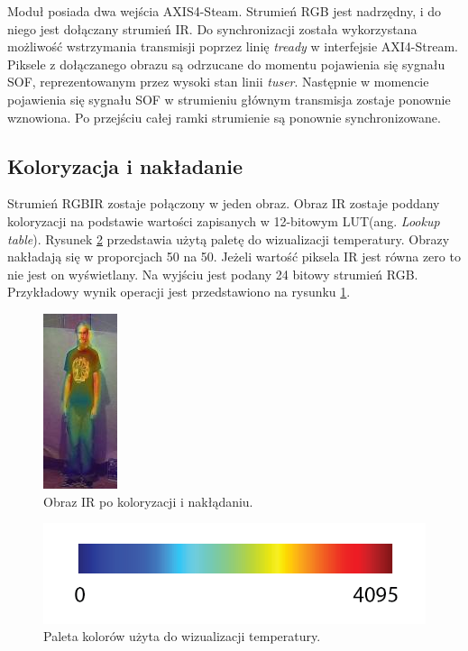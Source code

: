 Moduł posiada dwa wejścia AXIS4-Steam. Strumień RGB jest nadrzędny, i do niego jest dołączany  strumień IR. %
Do synchronizacji została wykorzystana możliwość wstrzymania transmisji poprzez linię \textit{tready} w interfejsie AXI4-Stream. 
Piksele z dołączanego obrazu są odrzucane do momentu pojawienia się sygnału SOF, reprezentowanym przez wysoki stan linii \textit{tuser}. Następnie w momencie pojawienia się sygnału SOF w strumieniu głównym transmisja zostaje ponownie wznowiona. %
Po przejściu całej ramki strumienie są ponownie synchronizowane.  
\subsection{Koloryzacja i nakładanie}
Strumień RGBIR zostaje połączony w jeden obraz. 
Obraz IR zostaje poddany koloryzacji na podstawie wartości zapisanych w 12-bitowym LUT(ang. \textit{Lookup table}). Rysunek \ref{fig:jetPalet} przedstawia użytą paletę do wizualizacji temperatury. Obrazy nakładają się w proporcjach 50 na 50. Jeżeli wartość piksela IR jest równa zero to nie jest on wyświetlany.
Na wyjściu jest podany 24 bitowy strumień RGB. Przykładowy wynik operacji jest przedstawiono na rysunku \ref{fig:koloryzacja}.
\begin{figure}
\centering
\includegraphics[width=0.3\linewidth]{images/koloryzacja.jpg}
\caption[Obraz IR po koloryzacji i nakłądaniu.]{Obraz IR po koloryzacji i nakłądaniu.}
\label{fig:koloryzacja}
\end{figure}

\begin{figure}
\centering
\includegraphics[width=0.5\linewidth]{images/jetPalet.png}
\caption[Paleta kolorów użyta do wizualizacji temperatury.]{ Paleta kolorów użyta do wizualizacji temperatury.}
\label{fig:jetPalet}
\end{figure}
